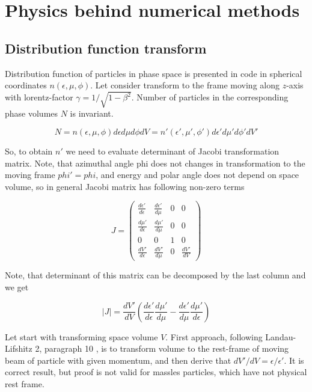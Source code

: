 \chapter{Physics behind numerical methods}\label{Formulae}

\section{Distribution function transform}
Distribution function of particles in phase space is presented in code in spherical coordinates $n(\epsilon,\mu,\phi)$. Let consider transform to the frame moving along $z$-axis with lorentz-factor $\gamma = 1/\sqrt{1-\beta^2}$. Number of particles in the corresponding phase volumes $N$ is invariant.

\begin{equation}
	N = n(\epsilon,\mu,\phi)d\epsilon d\mu d\phi dV = n'(\epsilon',\mu',\phi')d\epsilon' d\mu' d\phi' dV'
\end{equation}

So, to obtain $n'$ we need to evaluate determinant of Jacobi transformation matrix. Note, that azimuthal angle phi does not changes in transformation to the moving frame $phi' = phi$, and energy and polar angle does not depend on space volume, so in general Jacobi matrix has following non-zero terms

\begin{equation}\label{generalJacobi}
	J=\left(
	\begin{array}{cccc}
		\frac{d\epsilon'}{d\epsilon} & \frac{d\epsilon'}{d\mu}& 0 & 0\\
		\frac{d\mu'}{d\epsilon} & \frac{d\mu'}{d\mu} & 0 & 0\\
		0 & 0 & 1 & 0\\
		\frac{dV'}{d\epsilon} & \frac{dV'}{d\mu} & 0 & \frac{dV'}{dV}
	\end{array}
	\right)
\end{equation}

Note, that determinant of this matrix can be decomposed by the last column and we get

\begin{equation}
|J|=\frac{dV'}{dV}\left(\frac{d\epsilon'}{d\epsilon}\frac{d\mu'}{d\mu} - \frac{d\epsilon'}{d\mu}\frac{d\mu'}{d\epsilon}\right)
\end{equation}

Let start with transforming space volume $V$. First approach, following Landau-Lifshitz 2, paragraph 10 \cite{LandauLifshitz2}, is to transform volume to the rest-frame of moving beam of particle with given momentum, and then derive that $dV'/dV= \epsilon/\epsilon'$. It is correct result, but proof is not valid for massles particles, which have not physical rest frame.


